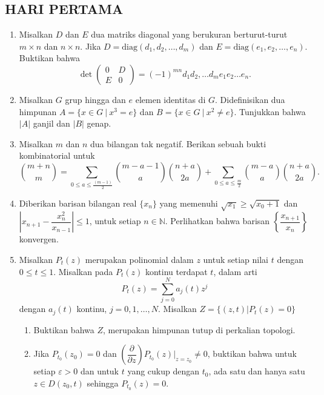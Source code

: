 \documentclass[12pt,twoside]{article}
\begin{document}
\subsection{HARI PERTAMA}
\begin{enumerate}
    \item Misalkan $D$ dan $E$ dua matriks diagonal yang berukuran berturut-turut $m\times n$ dan $n\times n$. Jika $D=\text{diag}(d_1,d_2,\dots,d_m)$ dan $E=\text{diag}(e_1,e_2,\dots,e_n)$. Buktikan bahwa $$\det\begin{pmatrix}
                  0 & D \\ E & 0
              \end{pmatrix}=(-1)^{mn}d_1d_2,\dots d_me_1e_2\dots e_n.$$


    \item Misalkan $G$ grup hingga dan $e$ elemen identitas di $G$. Didefinisikan dua himpunan $A=\{x\in G~|~x^3=e\}$ dan $B=\{x\in G~|~x^2\neq e\}$. Tunjukkan bahwa $|A|$ ganjil dan $|B|$ genap.

    \item Misalkan $m$ dan $n$ dua bilangan tak negatif. Berikan sebuah bukti kombinatorial untuk $$\binom{m+n}{m}=\sum_{0\leq a\leq \frac{(m-1)}{2}}\binom{m-a-1}{a}\binom{n+a}{2a}+\sum_{0\leq a\leq \frac{m}{2}}\binom{m-a}{a}\binom{n+a}{2a}.$$

    \item Diberikan barisan bilangan real $\{x_n\}$ yang memenuhi $\sqrt{x_1}\geq\sqrt{x_0+1}$ dan $\left|x_{n+1}-\dfrac{x_n^2}{x_{n-1}}\right|\leq 1$, untuk setiap $n\in\mathbb{N}$. Perlihatkan bahwa barisan $\left\lbrace   \dfrac{x_{n+1}}{x_n} \right\rbrace$ konvergen.


    \item Misalkan $P_t(z)$ merupakan polinomial dalam $z$ untuk setiap nilai $t$ dengan $0\leq t\leq 1$. Misalkan pada $P_t(z)$ kontinu terdapat $t$, dalam arti
          $$P_t(z)=\sum_{j=0}^{N}a_j(t)z^j$$
          dengan $a_j(t)$ kontinu, $j=0,1,\dots,N$. Misalkan $Z=\{(z,t)|P_t(z)=0\}$
          \begin{enumerate}
              \item [(a)] Buktikan bahwa $Z$, merupakan himpunan tutup di perkalian topologi.

              \item[(b)] Jika $P_{t_0}(z_0)=0$ dan $\left(\dfrac{\partial }{\partial z}\right)P_{t_0}(z)\big|_{z=z_0}\neq 0$, buktikan  bahwa untuk setiap $\varepsilon>0$ dan untuk $t$ yang cukup dengan $t_0$, ada satu dan hanya satu $z\in D(z_0,t)$ sehingga $P_{t_0}(z)=0$.	\end{enumerate}

\end{enumerate}
\newpage
\end{document}
